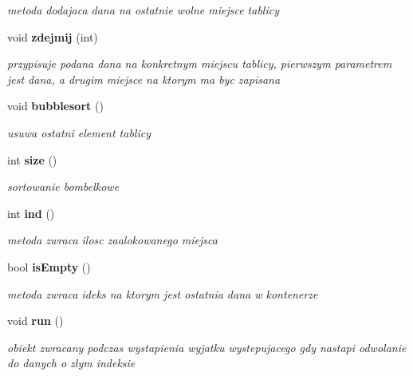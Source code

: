 \begin{DoxyCompactItemize}
\begin{DoxyCompactList}\small\item\em metoda dodajaca dana na ostatnie wolne miejsce tablicy \end{DoxyCompactList}\item 
void {\bf zdejmij} (int)\label{classtablica_aaab8198682dc839a3e99d2fe9a7ae83c}

\begin{DoxyCompactList}\small\item\em przypisuje podana dana na konkretnym miejscu tablicy, pierwszym parametrem jest dana, a drugim miejsce na ktorym ma byc zapisana \end{DoxyCompactList}\item 
void {\bf bubblesort} ()\label{classtablica_aad9a923a9ce031b2ecb6ae85645f4393}

\begin{DoxyCompactList}\small\item\em usuwa ostatni element tablicy \end{DoxyCompactList}\item 
int {\bf size} ()\label{classtablica_a8bd6d80f7531cf88748fe96f3082985b}

\begin{DoxyCompactList}\small\item\em sortowanie bombelkowe \end{DoxyCompactList}\item 
int {\bf ind} ()\label{classtablica_a6c6f6d3b9c1b5e51b3eb17c9c778c902}

\begin{DoxyCompactList}\small\item\em metoda zwraca ilosc zaalokowanego miejsca \end{DoxyCompactList}\item 
bool {\bf is\+Empty} ()\label{classtablica_ac0e975ae036568f85ec707bd7c2eba33}

\begin{DoxyCompactList}\small\item\em metoda zwraca ideks na ktorym jest ostatnia dana w kontenerze \end{DoxyCompactList}\item 
void {\bf run} ()\label{classtablica_a265617058d03a8e546e9aa77ed58c5f7}

\begin{DoxyCompactList}\small\item\em obiekt zwracany podczas wystapienia wyjatku wystepujacego gdy nastapi odwolanie do danych o zlym indeksie \end{DoxyCompactList}\end{DoxyCompactItemize}
